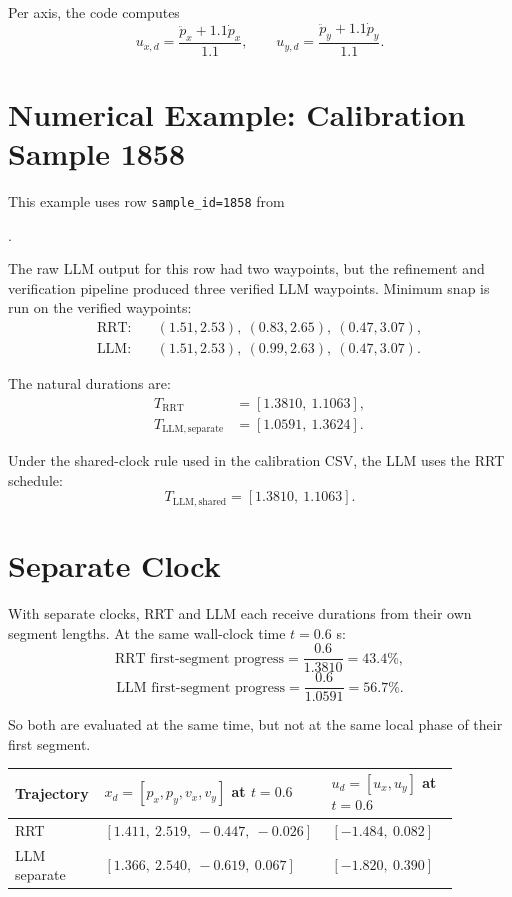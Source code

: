 \documentclass[11pt]{article}
\begin{document}
Per axis, the code computes
\[
u_{x,d} = \frac{\ddot p_x + 1.1\dot p_x}{1.1},
\qquad
u_{y,d} = \frac{\ddot p_y + 1.1\dot p_y}{1.1}.
\]

\section*{Numerical Example: Calibration Sample 1858}

This example uses row \texttt{sample\_id=1858} from
\begin{center}
.
\end{center}
The raw LLM output for this row had two waypoints, but the refinement and
verification pipeline produced three verified LLM waypoints.  Minimum snap is
run on the verified waypoints:
\[
\begin{aligned}
\text{RRT}:&\quad
(1.51,2.53),\ (0.83,2.65),\ (0.47,3.07),\\
\text{LLM}:&\quad
(1.51,2.53),\ (0.99,2.63),\ (0.47,3.07).
\end{aligned}
\]

The natural durations are:
\[
\begin{aligned}
T_{\mathrm{RRT}} &= [1.3810,\ 1.1063],\\
T_{\mathrm{LLM,separate}} &= [1.0591,\ 1.3624].
\end{aligned}
\]

Under the shared-clock rule used in the calibration CSV, the LLM uses the RRT
schedule:
\[
T_{\mathrm{LLM,shared}} = [1.3810,\ 1.1063].
\]

\section*{Separate Clock}

With separate clocks, RRT and LLM each receive durations from their own segment
lengths.  At the same wall-clock time $t=0.6$ s:
\[
\text{RRT first-segment progress} = \frac{0.6}{1.3810} = 43.4\%,
\]
\[
\text{LLM first-segment progress} = \frac{0.6}{1.0591} = 56.7\%.
\]

So both are evaluated at the same time, but not at the same local phase of their
first segment.

\begin{center}
\begin{tabular}{>{\raggedright\arraybackslash}p{0.18\linewidth}
                >{\raggedright\arraybackslash}p{0.42\linewidth}
                >{\raggedright\arraybackslash}p{0.28\linewidth}}
\hline
Trajectory & $x_d=[p_x,p_y,v_x,v_y]$ at $t=0.6$ & $u_d=[u_x,u_y]$ at $t=0.6$\\
\hline
RRT & $[1.411,\ 2.519,\ -0.447,\ -0.026]$ & $[-1.484,\ 0.082]$\\
LLM separate & $[1.366,\ 2.540,\ -0.619,\ 0.067]$ & $[-1.820,\ 0.390]$\\
\hline
\end{tabular}
\end{center}
\end{document}
